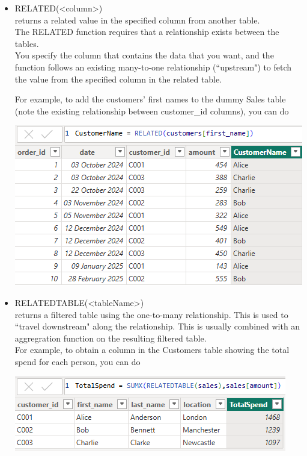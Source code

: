 \documentclass[10pt, openany, twocolumn]{book}
\begin{document}
\begin{itemize}
    \item RELATED(<column>)\\ returns a related value in the specified column from another table. \\
    
    The RELATED function requires that a relationship exists between the tables. \\
    
    You specify the column that contains the data that you want, and the function follows an existing many-to-one relationship (``upstream") to fetch the value from the specified column in the related table.

    For example, to add the customers' first names to the dummy Sales table (note the existing relationship between customer\_id columns), you can do        
    \begin{center}
        \includegraphics[width = 0.95\columnwidth]{images/RELATED.png}
    \end{center}  
    
    \item RELATEDTABLE(<tableName>)\\ returns a filtered table using the one-to-many relationship. This is used to ``travel downstream" along the relationship. This is usually combined with an aggregration function on the resulting filtered table. \\

    For example, to obtain a column in the Customers table showing the total spend for each person, you can do
    \begin{center}
        \includegraphics[width = 0.95\columnwidth]{images/RELATEDTABLE.png}
    \end{center}  


\end{itemize}
\end{document}
